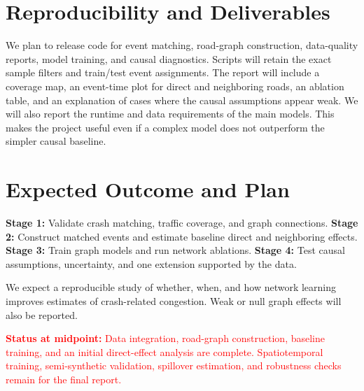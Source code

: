 \documentclass[sigconf,nonacm]{acmart}
\begin{document}
\section{Reproducibility and Deliverables}
We plan to release code for event matching, road-graph construction,
data-quality reports, model training, and causal diagnostics. Scripts
will retain the exact sample filters and train/test event assignments.
The report will include a coverage map, an event-time plot for direct
and neighboring roads, an ablation table, and an explanation of cases
where the causal assumptions appear weak. We will also report the
runtime and data requirements of the main models. This makes the
project useful even if a complex model does not outperform the
simpler causal baseline.

\section{Expected Outcome and Plan}
\textbf{Stage 1:} Validate crash matching, traffic coverage, and graph
connections. \textbf{Stage 2:} Construct matched events and estimate
baseline direct and neighboring effects. \textbf{Stage 3:} Train graph
models and run network ablations. \textbf{Stage 4:} Test causal
assumptions, uncertainty, and one extension supported by the data.

We expect a reproducible study of whether, when, and how network
learning improves estimates of crash-related congestion. Weak or null
graph effects will also be reported.

\textcolor{red}{\textbf{Status at midpoint:} Data integration,
road-graph construction, baseline training, and an initial direct-effect
analysis are complete. Spatiotemporal training, semi-synthetic
validation, spillover estimation, and robustness checks remain for the
final report.}



\end{document}
